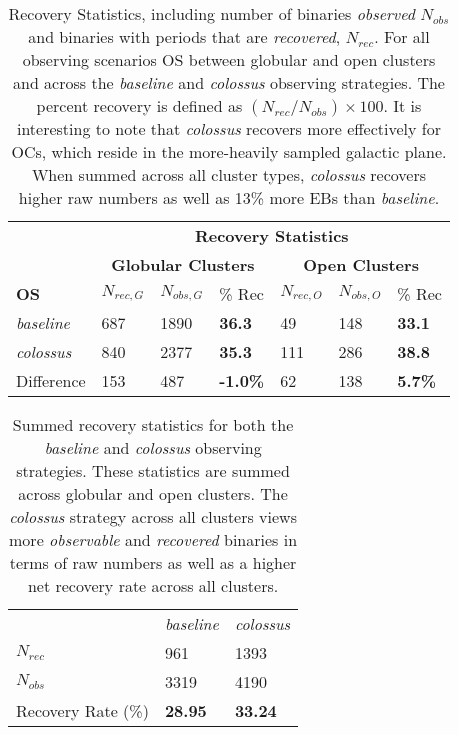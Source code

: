 \documentclass[twocolumn]{aastex63}
\begin{document}
    

\begin{table}%
    \centering
    \begin{tabular}{lllllll}
    
    & \multicolumn{6}{c}{{\textbf{Recovery Statistics}} }                         \\
    { \textbf{}}         & \multicolumn{3}{c}{{ \textbf{Globular Clusters}}} & \multicolumn{3}{c}{\textbf{Open Clusters}} \\
    \textbf{OS} &  $N_{rec,G}$ & $N_{obs,G}$ & \% Rec & $N_{rec,O}$ &  $N_{obs,O}$ & \% Rec \\
    \hline
    \textit{baseline} & 687 & 1890  & \textbf{36.3} &  49 & 148 & \textbf{33.1} \\
    \textit{colossus} & 840 & 2377 & \textbf{35.3} & 111 & 286 & \textbf{38.8} \\
    Difference & 153 & 487 & \textbf{-1.0\%} & 62 & 138 &  \textbf{5.7\%} \\
    
    \end{tabular}
    \caption{Recovery Statistics, including number of binaries \textit{observed} $N_{obs}$ and binaries with periods that are \textit{recovered}, $N_{rec}$. For all observing scenarios OS between globular and open clusters and across the \textit{baseline} and \textit{colossus} observing strategies. The percent recovery is defined as $(N_{rec}/N_{obs}) \times 100$. It is interesting to note that \textit{colossus} recovers more effectively for OCs, which reside in the more-heavily sampled galactic plane. When summed across all cluster types, \textit{colossus} recovers higher raw numbers as well as 13\% more EBs than \textit{baseline}.}
    \label{tab:recovery_table}

\end{table}

\begin{table}
    \centering
    \begin{tabular}{lll}
     & \textit{baseline} & \textit{colossus} \\
    {$N_{rec}$}  & {961} & {1393} \\
    {$N_{obs}$}  & {3319}& {4190}  \\ \hline
    {Recovery Rate (\%)} &  \textbf{28.95} & \textbf{33.24}
    \end{tabular}
    \caption{Summed recovery statistics for both the \textit{baseline} and \textit{colossus} observing strategies. These statistics are summed across globular and open clusters. The \textit{colossus} strategy across all clusters views more \textit{observable} and \textit{recovered} binaries in terms of raw numbers as well as a higher net recovery rate across all clusters.}
    \label{tab:summed_rec_stats}
\end{table}
\end{document}
